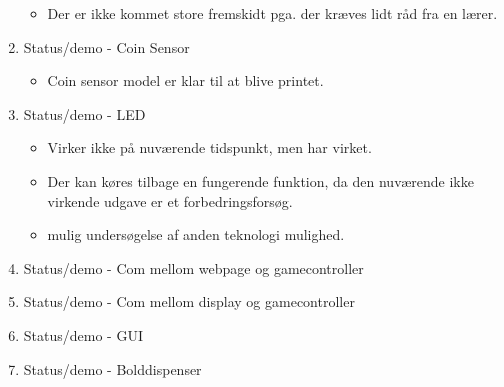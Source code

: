 \begin{enumerate}
        \begin{itemize}
            \item Der er ikke kommet store fremskidt pga. der kræves lidt råd fra en lærer. 
        \end{itemize}
    \item Status/demo - Coin Sensor
        \begin{itemize}
            \item Coin sensor model er klar til at blive printet.
        \end{itemize}
    \item Status/demo - LED
        \begin{itemize}
            \item Virker ikke på nuværende tidspunkt, men har virket. 
            \item Der kan køres tilbage en fungerende funktion, da den nuværende ikke virkende udgave er et forbedringsforsøg.
            \item mulig undersøgelse af anden teknologi mulighed.
        \end{itemize}
    \item Status/demo - Com mellom webpage og gamecontroller
    \item Status/demo - Com mellom display og gamecontroller
    \item Status/demo - GUI
    \item Status/demo - Bolddispenser
\end{enumerate}
